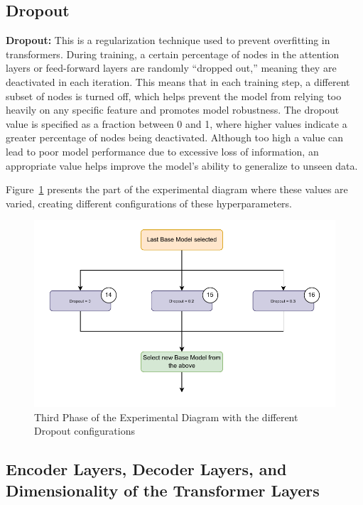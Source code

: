 \subsection{Dropout}
\textbf{Dropout:}  This is a regularization technique used to prevent overfitting in transformers. During training, a certain percentage of nodes in the attention layers or feed-forward layers are randomly “dropped out,” meaning they are deactivated in each iteration. This means that in each training step, a different subset of nodes is turned off, which helps prevent the model from relying too heavily on any specific feature and promotes model robustness. The dropout value is specified as a fraction between 0 and 1, where higher values indicate a greater percentage of nodes being deactivated. Although too high a value can lead to poor model performance due to excessive loss of information, an appropriate value helps improve the model’s ability to generalize to unseen data.

Figure~\ref{D3} presents the part of the experimental diagram where these values are varied, creating different configurations of these hyperparameters.

\begin{figure}[htbp]
    \centering
    \includegraphics[width=13 cm]{5_ChapterDesign/figuras/Diagrams/D3.pdf}
    \caption{Third Phase of the Experimental Diagram with the different Dropout configurations}
    \label{D3}
\end{figure}

\subsection{Encoder Layers, Decoder Layers, and Dimensionality of the Transformer Layers}

